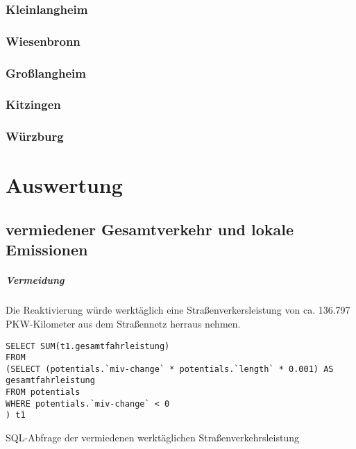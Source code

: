 \documentclass[fontsize=12pt,a4paper]{scrreprt}
\begin{document}
        \subsection{Kleinlangheim}
        

        \subsection{Wiesenbronn}
        

        \subsection{Großlangheim}
        

        \subsection{Kitzingen}
        

        \subsection{Würzburg}
        

        \clearpage
        \meinegespeichertenWerte
\chapter{Auswertung}
\section{vermiedener Gesamtverkehr und lokale Emissionen}

\paragraph{Vermeidung}
Die Reaktivierung würde werktäglich eine Straßenverkersleistung von ca. 136.797 PKW-Kilometer aus dem Straßennetz herraus nehmen.

\begin{listing}[htbp]
        \begin{verbatim}
SELECT SUM(t1.gesamtfahrleistung)  
FROM
(SELECT (potentials.`miv-change` * potentials.`length` * 0.001) AS gesamtfahrleistung
FROM potentials
WHERE potentials.`miv-change` < 0
) t1
\end{verbatim}
        \caption{SQL-Abfrage der vermiedenen werktäglichen Straßenverkehrsleistung}\label{lst-verm-werktaeglich}
\end{listing}
\end{document}
